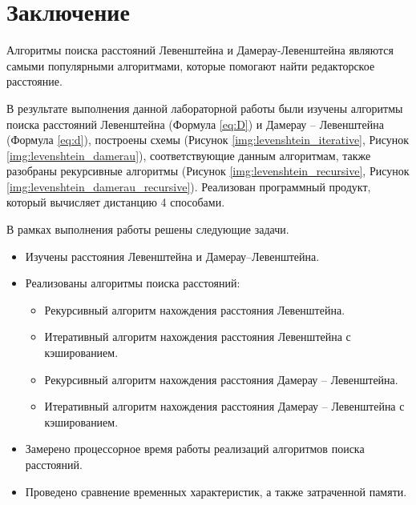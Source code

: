 \chapter*{Заключение}

Алгоритмы поиска расстояний Левенштейна и Дамерау-Левенштейна являются самыми популярными алгоритмами, которые помогают найти редакторское расстояние.

В результате выполнения данной лабораторной работы были изучены алгоритмы поиска расстояний Левенштейна (Формула \ref{eq:D}) и Дамерау -- Левенштейна (Формула \ref{eq:d}), построены схемы (Рисунок \ref{img:levenshtein_iterative}, Рисунок \ref{img:levenshtein_damerau}), соответствующие данным алгоритмам, также разобраны рекурсивные алгоритмы (Рисунок \ref{img:levenshtein_recursive}, Рисунок \ref{img:levenshtein_damerau_recursive}). Реализован программный продукт, который вычисляет дистанцию 4 способами.


В рамках выполнения работы решены следующие задачи.
\begin{itemize}
	\item Изучены расстояния Левенштейна и Дамерау--Левенштейна.
	\item Реализованы алгоритмы поиска расстояний: 
	\begin{itemize}
		\item Рекурсивный алгоритм нахождения расстояния Левенштейна.
		\item Итеративный алгоритм нахождения расстояния Левенштейна с кэшированием.
		\item Рекурсивный алгоритм нахождения расстояния Дамерау -- Левенштейна.
		\item Итеративный алгоритм нахождения расстояния Дамерау -- Левенштейна с кэшированием.
	\end{itemize}
	\item Замерено процессорное время работы реализаций алгоритмов поиска расстояний.
	\item Проведено сравнение временных характеристик, а также затраченной памяти.
\end{itemize}
